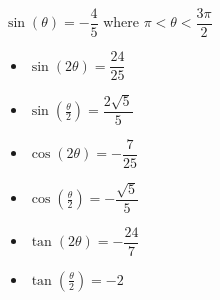{$\sin(\theta) = -\dfrac{4}{5}$ where $\pi < \theta < \dfrac{3\pi}{2}$}
{\begin{itemize}
\item $\sin(2\theta) = \dfrac{24}{25}$
\item $\sin\left(\frac{\theta}{2}\right) = \dfrac{2\sqrt{5}}{5}$
\item $\cos(2\theta) = -\dfrac{7}{25}$
\item $\cos\left(\frac{\theta}{2}\right) = -\dfrac{\sqrt{5}}{5}$
\item $\tan(2\theta)=-\dfrac{24}{7} $
\item $\tan\left(\frac{\theta}{2}\right) = -2$
\end{itemize}}
